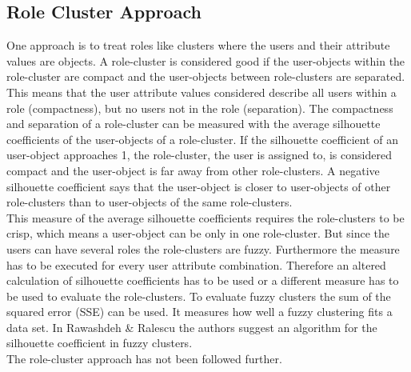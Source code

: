         \subsection{Role Cluster Approach}
        One approach is to treat roles like clusters where the users and their attribute values are objects. A role-cluster is considered good if the user-objects within the role-cluster are compact and the user-objects between role-clusters are separated. This means that the user attribute values considered describe all users within a role (compactness), but no users not in the role (separation). The compactness and separation of a role-cluster can be measured with the average silhouette coefficients of the user-objects of a role-cluster\cite{Han}. If the silhouette coefficient of an user-object approaches 1, the role-cluster, the user is assigned to, is considered compact and the user-object is far away from other role-clusters. A negative silhouette coefficient says that the user-object is closer to user-objects of other role-clusters than to user-objects of the same role-clusters.\\
        This measure of the average silhouette coefficients requires the role-clusters to be crisp, which means a user-object can be only in one role-cluster. But since the users can have several roles the role-clusters are fuzzy. Furthermore the measure has to be executed for every user attribute combination. Therefore an altered calculation of silhouette coefficients has to be used or a different measure has to be used to evaluate the role-clusters. To evaluate fuzzy clusters the sum of the squared error (SSE) can be used\cite{Han}. It measures how well a fuzzy clustering fits a data set. In Rawashdeh \& Ralescu\cite{rawashdeh2012fuzzy} the authors suggest an algorithm for the silhouette coefficient in fuzzy clusters.\\
        The role-cluster approach has not been followed further.
